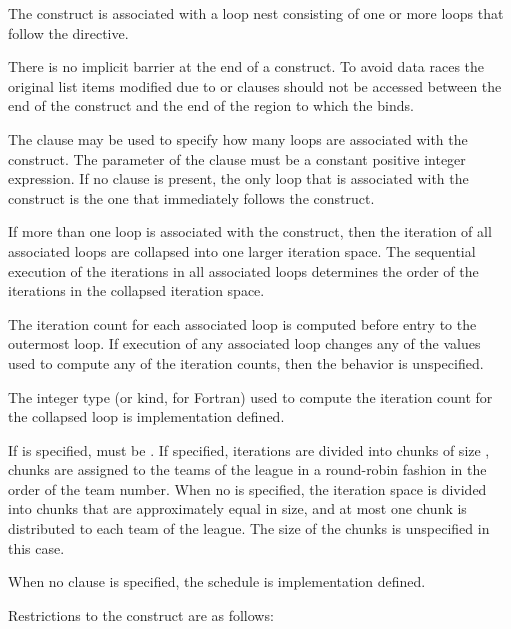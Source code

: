 {{{{\begin{samepage}
\descr
The  construct is associated with a loop nest consisting of one or more 
loops that follow the directive.

There is no implicit barrier at the end of a  construct.
To avoid data races the original
list items modified due to  or  clauses
should not be accessed between the end of the  construct and the end
of the  region to which the  binds.

\end{samepage}

The  clause may be used to specify how many loops are associated with the 
 construct. The parameter of the  clause must be a constant 
positive integer expression. If no  clause is present, the only loop that is 
associated with the  construct is the one that immediately follows the 
 construct.

If more than one loop is associated with the  construct, then the iteration 
of all associated loops are collapsed into one larger iteration space. The sequential 
execution of the iterations in all associated loops determines the order of the iterations in 
the collapsed iteration space.

The iteration count for each associated loop is computed before entry to the outermost loop. If execution of any associated loop changes any of the values used to compute any of the iteration counts, then the behavior is unspecified. 

The integer type (or kind, for Fortran) used to compute the iteration count for the collapsed loop is implementation defined.

If  is specified,  must be . If specified, iterations are 
divided into chunks of size , chunks are assigned to the teams of the league in 
a round-robin fashion in the order of the team number. When no  is specified, 
the iteration space is divided into chunks that are approximately equal in size, and at 
most one chunk is distributed to each team of the league. The size of the 
chunks is unspecified in this case.

When no  clause is specified, the schedule is implementation defined.

\restrictions
Restrictions to the  construct are as follows:

}}}}
